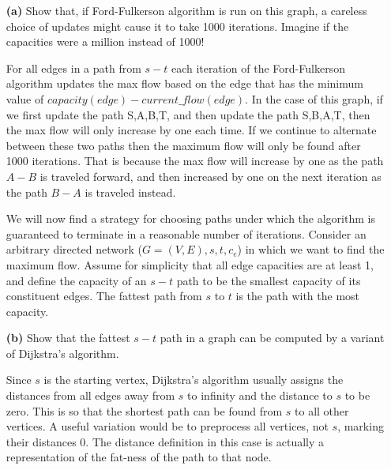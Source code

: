 \documentclass[11pt]{article}
\begin{document}
\begin{itemize}
\item[{\bf (a)}] Show that, if Ford-Fulkerson algorithm is run on this graph, 
  a careless choice of updates might cause it to take 1000 iterations. 
  Imagine if the capacities were a million instead of 1000!

  For all edges in a path from $s - t$ each iteration of the Ford-Fulkerson 
  algorithm updates the max flow based on the edge that has the minimum 
  value of $capacity(edge) - current\_flow(edge)$.  In the case of this graph, if we 
  first update the path S,A,B,T, and then update the path S,B,A,T, then the
  max flow will only increase by one each time. If we continue to alternate between
  these two paths then the maximum flow will only be found after 1000 iterations.
  That is because the max flow
  will increase by one as the path $A-B$ is traveled forward, and then increased
  by one on the next iteration as the path $B- A$ is traveled instead.

   We will now find a strategy for choosing paths under which the algorithm 
   is guaranteed to terminate in a reasonable number of iterations.
   Consider an arbitrary directed network ($G = (V,E),s,t,{c_e}$) in which we 
   want to find the maximum flow. Assume for simplicity that all edge 
   capacities are at least 1, and define the capacity of an $s - t$ path to 
   be the smallest capacity of its constituent edges. 
   The fattest path from $s$ to $t$ is the path with the most capacity.

 \item[{\bf (b)}] Show that the fattest $s - t$ path in a graph can be 
   computed by a variant of Dijkstra's algorithm.

 Since $s$ is the starting vertex, Dijkstra's algorithm usually assigns the 
 distances from all edges away from $s$ to infinity and the distance to $s$ to
 be zero. This is so that the shortest path can be found from $s$ to all other
 vertices. A useful variation would be to preprocess all vertices, not $s$, marking 
 their distances $0$. The distance definition in this case is actually a
 representation of the fat-ness of the path to that node. 


\end{itemize}
\label{pg:end-of-p3}

%
\end{document}

